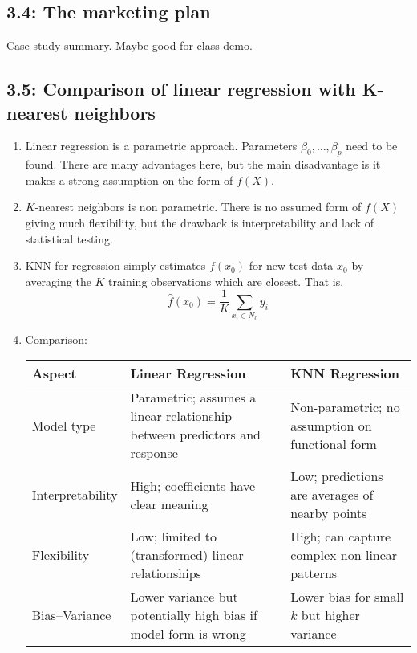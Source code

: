 \documentclass{article}
\begin{document}
\subsection*{3.4: The marketing plan}

Case study summary. Maybe good for class demo.

\subsection*{3.5: Comparison of linear regression with K-nearest neighbors}

\begin{enumerate}
\item Linear regression is a parametric approach. Parameters $\beta_0, \dots, \beta_p$ need to be found. There are many advantages here, but the main disadvantage is it makes a strong assumption on the form of $f(X)$.
\item $K$-nearest neighbors is non parametric. There is no assumed form of $f(X)$ giving much flexibility, but the drawback is interpretability and lack of statistical testing.
\item KNN for regression simply estimates $f(x_0)$ for new test data $x_0$ by averaging the $K$ training observations which are closest. That is,
\[
\hat{f}(x_0) = \frac{1}{K} \sum_{x_i \in N_0} y_i
\]
\item Comparison:
\begin{table}[h]
\centering
\begin{tabular}{|l|p{6cm}|p{6cm}|}
\hline
\textbf{Aspect} & \textbf{Linear Regression} & \textbf{KNN Regression} \\
\hline
Model type & Parametric; assumes a linear relationship between predictors and response & Non-parametric; no assumption on functional form \\
\hline
Interpretability & High; coefficients have clear meaning & Low; predictions are averages of nearby points \\
\hline
Flexibility & Low; limited to (transformed) linear relationships & High; can capture complex non-linear patterns \\
\hline
Bias--Variance & Lower variance but potentially high bias if model form is wrong & Lower bias for small $k$ but higher variance \\

\end{tabular}
\end{table}
\end{enumerate}
\end{document}
